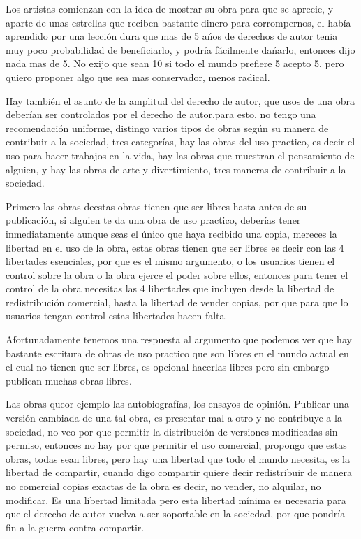 \begin{multicols}{2}
Los artistas comienzan con la idea de mostrar su obra para que se aprecie, y aparte de unas estrellas que reciben bastante dinero para corrompernos,{\em {\color{introcolor}{  la mayoría no recibe nunca tanto dinero y sigue deseando que su obra se aprecie, }}}  el había aprendido por una lección dura que mas de 5 ańos de derechos de autor tenia muy poco probabilidad de beneficiarlo, y podría fácilmente dańarlo, entonces dijo nada mas de 5.  No exijo que sean 10 si todo el mundo prefiere 5 acepto 5. pero quiero proponer algo que sea mas conservador, menos radical.




Hay también el asunto de la amplitud del derecho de autor, que usos de una obra deberían ser controlados por el derecho de autor,para esto, no tengo una recomendación uniforme, distingo varios tipos de obras según su manera de contribuir a la sociedad, tres categorías, hay las obras del uso practico, es decir el uso para hacer trabajos en la vida, hay las obras que muestran el pensamiento de alguien, y hay las obras de arte y divertimiento, tres maneras de contribuir a la sociedad.

Primero las obras de{\em {\color{introcolor}{ uso practico, }}}estas obras tienen que ser libres hasta antes de su publicación, si alguien te da una obra de uso practico, deberías tener inmediatamente aunque seas el único que haya recibido una copia, mereces la libertad en el uso de la obra, estas obras tienen que ser libres es decir con las 4 libertades esenciales, por que es el mismo argumento, o los usuarios tienen el control sobre la obra o la obra ejerce el poder sobre ellos, entonces para tener el control de la obra necesitas las 4 libertades que incluyen desde la libertad de redistribución comercial, hasta la libertad de vender copias, por que para que lo usuarios tengan control estas libertades hacen falta.

Afortunadamente tenemos una respuesta al argumento que {\em {\color{introcolor}{ si no sedemos la libertad no escribirían estas obras, }}}podemos ver que hay bastante escritura de obras de uso practico que son libres en el mundo actual en el cual no tienen que ser libres, es opcional hacerlas libres pero sin embargo publican muchas obras libres.

Las obras que{\em {\color{introcolor}{ muestran el pensamiento de alguien, }}}or ejemplo las autobiografías, los ensayos de opinión. Publicar una versión cambiada de una tal obra, es presentar mal a otro y no contribuye a la sociedad, no veo por que permitir la distribución de versiones modificadas sin permiso, entonces no hay por que permitir el uso comercial, propongo que estas obras, todas sean libres, pero hay una libertad que todo el mundo necesita, es la libertad de compartir, cuando digo compartir quiere decir redistribuir de manera no comercial copias exactas de la obra es decir, no vender, no alquilar, no modificar. Es una libertad limitada pero esta libertad mínima es necesaria para que el derecho de autor vuelva a ser soportable en la sociedad, por que pondría fin a la guerra contra compartir.  


\end{multicols}
